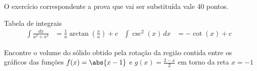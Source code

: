 \documentclass[a4paper,12pt,fleqn]{article}
\begin{document}

O exercício correspondente a prova que vai ser substituída vale 40 pontos.

\vspace{\baselineskip}
Tabela de integrais
\begin{align*}
  \int \frac{dx}{a^2+x^2} & = \frac{1}{a}\arctan\left(\frac{x}{a}\right) + c &
  \int \csc^2(x) \, dx & = -\cot(x) + c
\end{align*}

Encontre o volume do sólido obtido pela rotação da região contida entre
os gráficos das funções \(f(x)=\abs{x-1}\) e \(g(x)=\frac{2-x}{2}\)
em torno da reta \(x=-1\)
\end{document}
